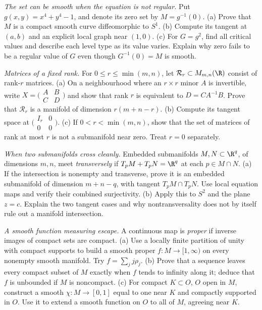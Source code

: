 \begin{exercise}[$\star\star$]\label{ex:v9-defining-function}
\emph{The set can be smooth when the equation is not regular.} Put $g(x,y)=x^4+y^4-1$, and denote its zero set by $M=g^{-1}(0)$. (a) Prove that $M$ is a compact smooth curve diffeomorphic to $S^1$. (b) Compute its tangent at $(a,b)$ and an explicit local graph near $(1,0)$. (c) For $G=g^2$, find all critical values and describe each level type as its value varies. Explain why zero fails to be a regular value of $G$ even though $G^{-1}(0)=M$ is smooth.
\end{exercise}
\begin{exercise}[$\star\star$]\label{ex:v9-rank-matrix-chart}
\emph{Matrices of a fixed rank.} For $0\le r\le\min(m,n)$, let $\mathcal R_r\subset M_{m,n}(\R)$ consist of rank-$r$ matrices. (a) On a neighbourhood where an $r\times r$ minor $A$ is invertible, write $X=\bigl(\begin{smallmatrix}A&B\\C&D\end{smallmatrix}\bigr)$ and show that rank $r$ is equivalent to $D=CA^{-1}B$. Prove that $\mathcal R_r$ is a manifold of dimension $r(m+n-r)$. (b) Compute its tangent space at $\bigl(\begin{smallmatrix}I_r&0\\0&0\end{smallmatrix}\bigr)$. (c) If $0<r<\min(m,n)$, show that the set of matrices of rank at most $r$ is not a submanifold near zero. Treat $r=0$ separately.
\end{exercise}
\begin{exercise}[$\star\star\star$]\label{ex:v9-transverse-intersections}
\emph{When two submanifolds cross cleanly.} Embedded submanifolds $M,N\subset\R^q$, of dimensions $m,n$, meet \emph{transversely} if $T_pM+T_pN=\R^q$ at each $p\in M\cap N$. (a) If the intersection is nonempty and transverse, prove it is an embedded submanifold of dimension $m+n-q$, with tangent $T_pM\cap T_pN$. Use local equation maps and verify their combined surjectivity. (b) Apply this to $S^2$ and the plane $z=c$. Explain the two tangent cases and why nontransversality does not by itself rule out a manifold intersection.
\end{exercise}
\begin{exercise}[$\star\star$]\label{ex:v9-proper-exhaustion}
\emph{A smooth function measuring escape.} A continuous map is \emph{proper} if inverse images of compact sets are compact. (a) Use a locally finite partition of unity with compact supports to build a smooth proper $f:M\to[1,\infty)$ on every nonempty smooth manifold. Try $f=\sum_jj\rho_j$. (b) Prove that a sequence leaves every compact subset of $M$ exactly when $f$ tends to infinity along it; deduce that $f$ is unbounded if $M$ is noncompact. (c) For compact $K\subset O$, $O$ open in $M$, construct a smooth $\chi:M\to[0,1]$ equal to one near $K$ and compactly supported in $O$. Use it to extend a smooth function on $O$ to all of $M$, agreeing near $K$.
\end{exercise}

